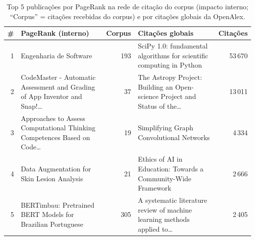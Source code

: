 \begin{table}[htbp]
\centering
\small
\caption{Top 5 publicações por PageRank na rede de citação do corpus (impacto interno; ``Corpus'' = citações recebidas do corpus) e por citações globais da OpenAlex.}
\label{tab:toppub}
\begin{tabular}{rp{5.0cm}rp{5.0cm}r}
\hline
\# & PageRank (interno) & Corpus & Citações globais & Citações \\
\hline
1 & Engenharia de Software & 193 & SciPy 1.0: fundamental algorithms for scientific computing in Python & 53\,670 \\
2 & CodeMaster - Automatic Assessment and Grading of App Inventor and Snap!\ldots & 37 & The Astropy Project: Building an Open-science Project and Status of the\ldots & 13\,011 \\
3 & Approaches to Assess Computational Thinking Competences Based on Code\ldots & 19 & Simplifying Graph Convolutional Networks & 4\,334 \\
4 & Data Augmentation for Skin Lesion Analysis & 21 & Ethics of AI in Education: Towards a Community-Wide Framework & 2\,666 \\
5 & BERTimbau: Pretrained BERT Models for Brazilian Portuguese & 305 & A systematic literature review of machine learning methods applied to\ldots & 2\,405 \\
\hline
\end{tabular}
\end{table}

